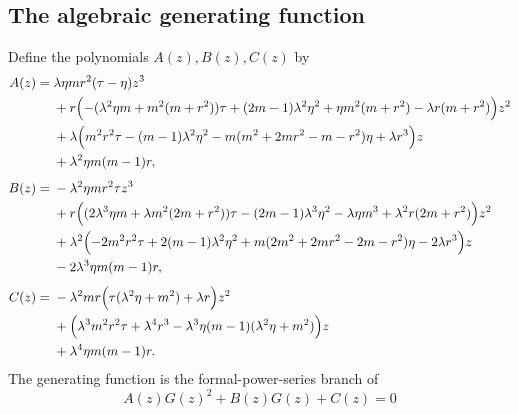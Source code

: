\documentclass[11pt]{article}
\theoremstyle{remark}
\begin{document}
\subsection{The algebraic generating function}
\label{sec:algebraic-gf}


Define the polynomials $A(z),B(z),C(z)$ by
\begin{align}
 A(z)={}&\lambda\eta mr^2(\tau-\eta)z^3 \\
 &+r\Bigl(-(\lambda^2\eta m+m^2(m+r^2))\tau
 +(2m-1)\lambda^2\eta^2+\eta m^2(m+r^2)
 -\lambda r(m+r^2)\Bigr)z^2 \\
 &+\lambda\Bigl(m^2r^2\tau-(m-1)\lambda^2\eta^2
 -m(m^2+2mr^2-m-r^2)\eta+\lambda r^3\Bigr)z \\
 &+\lambda^2\eta m(m-1)r,
 \label{eq:A}\\[0.4em]
 B(z)={}&-\lambda^2\eta mr^2\tau z^3 \\
 &+r\Bigl((2\lambda^3\eta m+\lambda m^2(2m+r^2))\tau
 -(2m-1)\lambda^3\eta^2-\lambda\eta m^3
 +\lambda^2r(2m+r^2)\Bigr)z^2 \\
 &+\lambda^2\Bigl(-2m^2r^2\tau+2(m-1)\lambda^2\eta^2
 +m(2m^2+2mr^2-2m-r^2)\eta-2\lambda r^3\Bigr)z \\
 &-2\lambda^3\eta m(m-1)r,
 \label{eq:B}\\[0.4em]
 C(z)={}&-\lambda^2mr\Bigl(\tau(\lambda^2\eta+m^2)+\lambda r\Bigr)z^2 \\
 &+\Bigl(\lambda^3m^2r^2\tau+\lambda^4r^3
 -\lambda^3\eta(m-1)(\lambda^2\eta+m^2)\Bigr)z \\
 &+\lambda^4\eta m(m-1)r.
 \label{eq:C}
\end{align}
The generating function is the formal-power-series branch of
\begin{equation}
 A(z)G(z)^2+B(z)G(z)+C(z)=0
 \label{eq:quadratic}
\end{equation}
\end{document}
